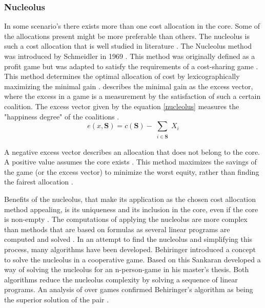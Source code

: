 \subsubsection{Nucleolus}
In some scenario's there exists more than one cost allocation in the core. Some of the allocations present might be more preferable than others. The nucleolus is such a cost allocation that is well studied in literature \citep{ozener2008allocating}.
The Nucleolus method was introduced by Schmeidler in 1969 \citep{ozener2008allocating}. This method was originally defined as a profit game but was adapted to satisfy the requirements of a cost-sharing game  \citep{guajardo2016review}.
This method determines the optimal allocation of cost by lexicographically maximizing the minimal gain \citep{ozener2008allocating}. \citet{guajardo2016review} describes the minimal gain as the excess vector, where the excess in a game is a measurement by the satisfaction of such a certain coalition. The excess vector given by the equation \ref{nucleolus} measures the "happiness degree" of the coalitions \citep{lemaire1984application}.
\begin{equation}
\label{nucleolus}
e(x,\textbf{S}) = c(\textbf{S}) - \sum_{\substack{i\in \textbf{S}}} X_i
\end{equation}

A negative excess vector describes an allocation that does not belong to the core. A positive value assumes the core exists \citep{tanczos2005analysis}. This method maximizes the savings of the game (or the excess vector) to minimize the worst equity, rather than finding the fairest allocation \citep{janjevic2018investigating}.

Benefits of the nucleolus, that make its application as the chosen cost allocation method appealing, is its uniqueness \citep{guajardo2016review} and its inclusion in the core, even if the core is non-empty \citep{ozener2008allocating}. The computations of applying the nucleolus are more complex than methods that are based on formulas \citep{guajardo2016review} as several linear programs are computed and solved \citep{defryn2013gain}.
In an attempt to find the nucleolus and simplifying this process, many algorithms have been developed. Behiringer introduced a concept to solve the nucleolus in a cooperative game. Based on this Sankaran developed a way of solving the nucleolus for an n-person-game in his master's thesis. Both algorithms reduce the nucleolus complexity by solving a sequence of linear programs. An analysis of over games confirmed Behiringer's algorithm as being the superior solution of the pair \citep{fromen1997reducing}.\par

